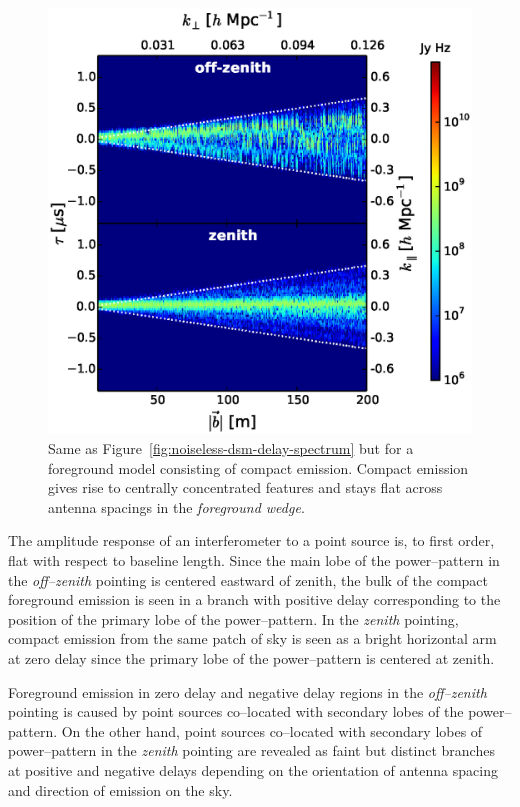 \documentclass[preprint2,iop,numberedappendix]{emulateapj}
\begin{document}
\begin{figure}[htb]
\centering
\includegraphics[width=\linewidth]{f9.eps}
\caption{Same as Figure~\ref{fig:noiseless-dsm-delay-spectrum} but for a foreground model consisting of compact emission. Compact emission gives rise to centrally concentrated features and stays flat across antenna spacings in the {\it foreground wedge}.\label{fig:noiseless-csm-delay-spectrum}}
\end{figure}

The amplitude response of an interferometer to a point source is, to first order, flat with respect to baseline length. Since the main lobe of the power--pattern in the {\it off--zenith} pointing is centered eastward of zenith, the bulk of the compact foreground emission is seen in a branch with positive delay corresponding to the position of the primary lobe of the power--pattern. In the {\it zenith} pointing, compact emission from the same patch of sky is seen as a bright horizontal arm at zero delay  since the primary lobe of the power--pattern is centered at zenith. 

Foreground emission in zero delay and negative delay regions in the {\it off--zenith} pointing is caused by point sources co--located with secondary lobes of the power--pattern. On the other hand, point sources co--located with secondary lobes of power--pattern in the {\it zenith} pointing are revealed as faint but distinct branches at positive and negative delays depending on the orientation of antenna spacing and direction of emission on the sky. 
\end{document}
